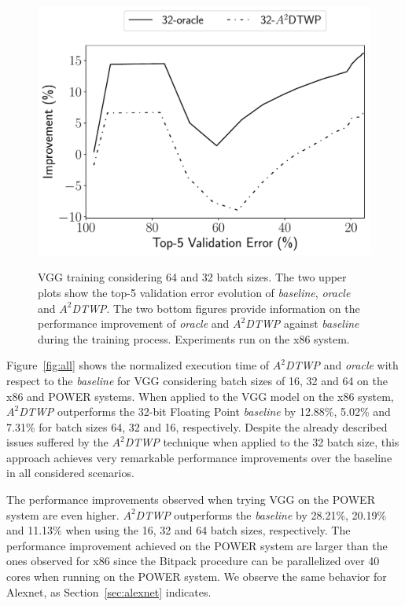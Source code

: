\begin{figure}[!bhtp]
{{            \includegraphics[scale=0.450]{bitpack/figs/vgg/small_3/vgg_train_improvement_agg_top5_32-baseline.pdf}
        }
    }
    \caption{VGG training considering 64 and 32 batch sizes. The two upper plots 
    show the top-5 validation error evolution of
    \textit{baseline}, \textit{oracle} and \textit{$A^2$DTWP}.
    The two bottom figures provide information on the performance improvement of
    \textit{oracle} and \textit{$A^2$DTWP} against \textit{baseline} during the
    training process. Experiments run on the x86 system.
    }
    \label{vgg_improv}
\end{figure}


Figure~\ref{fig:all} shows the normalized execution time of \textit{$A^2$DTWP} 
and \textit{oracle} with respect to the \textit{baseline} for VGG considering 
batch sizes of 16, 32 and 64 on the x86 and POWER systems.
When applied to the VGG model on the x86 system, \textit{$A^2$DTWP} outperforms 
the 32-bit Floating Point \textit{baseline} by 12.88\%, 5.02\% and 7.31\% for 
batch sizes 64, 32 and 16, respectively.
Despite the already described issues suffered by the \textit{$A^2$DTWP} 
technique when applied to the 32 batch size, this approach achieves very 
remarkable performance improvements over the baseline in all considered 
scenarios. 

The performance improvements observed when trying VGG on the POWER system are 
even higher.
\textit{$A^2$DTWP} outperforms the \textit{baseline} by 28.21\%, 20.19\% and 
11.13\% when using the 16, 32 and 64 batch sizes, respectively.
The performance improvement achieved on the POWER system are larger than the 
ones observed for x86 since the Bitpack procedure can be parallelized over 40 
cores when running on the POWER system.
We observe the same behavior for Alexnet, as Section~\ref{sec:alexnet} 
indicates.


